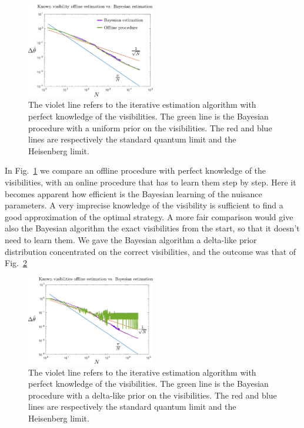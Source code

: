 \documentclass[aps, pra, 10pt, twocolumn, superscriptaddress,floatfix]{revtex4-1}
\begin{document}
%
\begin{figure}[!t]
	\begin{center}
		\includegraphics[width=0.5\textwidth]{trueVisibilities.pdf}
	\end{center}
	\caption{The violet line refers to the iterative estimation algorithm with perfect knowledge of the visibilities. The green line is the Bayesian procedure with a uniform prior on the visibilities. The red and blue lines are respectively the standard quantum limit and the Heisenberg limit.}
	\label{fig:trueVisibilities}
\end{figure}
%
In Fig.~\ref{fig:trueVisibilities} we compare an offline procedure with perfect knowledge of the visibilities, with an online procedure that has to learn them step by step. Here it becomes apparent how efficient is the Bayesian learning of the nuisance parameters. A very imprecise knowledge of the visibility is sufficient to find a good approximation of the optimal strategy. A more fair comparison would give also the Bayesian algorithm the exact visibilities from the start, so that it doesn't need to learn them. We gave the Bayesian algorithm a delta-like prior distribution concentrated on the correct visibilities, and the outcome was that of Fig.~\ref{fig:exactVisibilitiesBayesian}
%
\begin{figure}[!t]
	\begin{center}
		\includegraphics[width=0.5\textwidth]{exactVisibilitiesBayesian.pdf}
	\end{center}
	\caption{The violet line refers to the iterative estimation algorithm with perfect knowledge of the visibilities. The green line is the Bayesian procedure with a delta-like prior on the visibilities. The red and blue lines are respectively the standard quantum limit and the Heisenberg limit.}
	\label{fig:exactVisibilitiesBayesian}
\end{figure}
\end{document}
